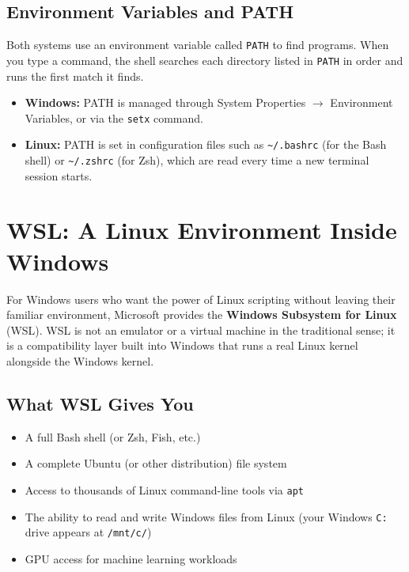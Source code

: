 \subsection{Environment Variables and PATH}

Both systems use an environment variable called \texttt{PATH} to find
programs. When you type a command, the shell searches each directory listed
in \texttt{PATH} in order and runs the first match it finds.

\begin{itemize}
  \item \textbf{Windows:} PATH is managed through System Properties $\to$
        Environment Variables, or via the \texttt{setx} command.
  \item \textbf{Linux:} PATH is set in configuration files such as
        \texttt{\textasciitilde/.bashrc} (for the Bash shell) or
        \texttt{\textasciitilde/.zshrc} (for Zsh), which are read every time
        a new terminal session starts.
\end{itemize}

\section{WSL: A Linux Environment Inside Windows}
\label{sec:wsl}

For Windows users who want the power of Linux scripting without leaving their
familiar environment, Microsoft provides the
\textbf{Windows Subsystem for Linux} (WSL). WSL is not an emulator or a
virtual machine in the traditional sense; it is a compatibility layer built
into Windows that runs a real Linux kernel alongside the Windows kernel.

\subsection{What WSL Gives You}

\begin{itemize}
  \item A full Bash shell (or Zsh, Fish, etc.)
  \item A complete Ubuntu (or other distribution) file system
  \item Access to thousands of Linux command-line tools via \texttt{apt}
  \item The ability to read and write Windows files from Linux
        (your Windows \texttt{C:} drive appears at \texttt{/mnt/c/})
  \item GPU access for machine learning workloads
\end{itemize}

